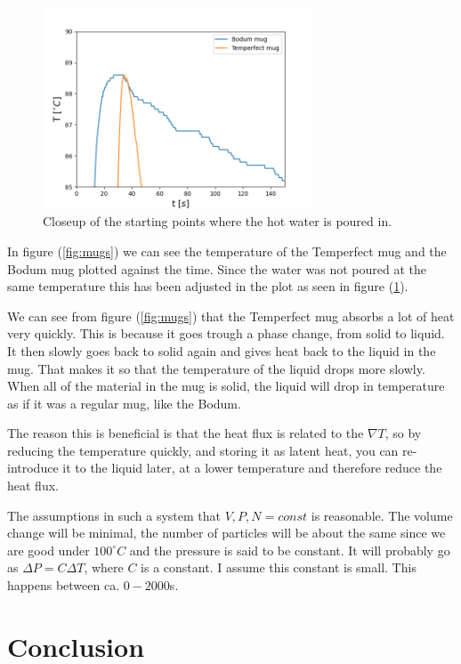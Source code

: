 \documentclass[reprint,english,notitlepage]{revtex4-1}  %
\begin{document}
\begin{figure}
\centering
\includegraphics[width=8cm]{../figures/mugs_2.png}
\caption{Closeup of the starting points where the hot water is poured in.}
\label{fig:mugs_2}
\end{figure}


In figure (\ref{fig:mugs}) we can see the temperature of the Temperfect mug and the Bodum mug plotted against the time. Since the water was not poured at the same temperature this has been adjusted in the plot as seen in figure (\ref{fig:mugs_2}). 

We can see from figure (\ref{fig:mugs}) that the Temperfect mug absorbs a lot of heat very quickly. This is because it goes trough a phase change, from solid to liquid. It then slowly goes back to solid again and gives heat back to the liquid in the mug. That makes it so that the temperature of the liquid drops more slowly. When all of the material in the mug is solid, the liquid will drop in temperature as if it was a regular mug, like the Bodum.

The reason this is beneficial is that the heat flux is related to the $\nabla T$, so by reducing the temperature quickly, and storing it as latent heat, you can re-introduce it to the liquid later, at a lower temperature and therefore reduce the heat flux.

The assumptions in such a system that $V,P,N=const$ is reasonable. The volume change will be minimal, the number of particles will be about the same since we are good under $100^{\circ}C$ and the pressure is said to be constant. It will probably go as $\Delta P=C\Delta T$, where $C$ is a constant. I assume this constant is small. This happens between ca. $0-2000$s. 






\section{Conclusion}
\end{document}
